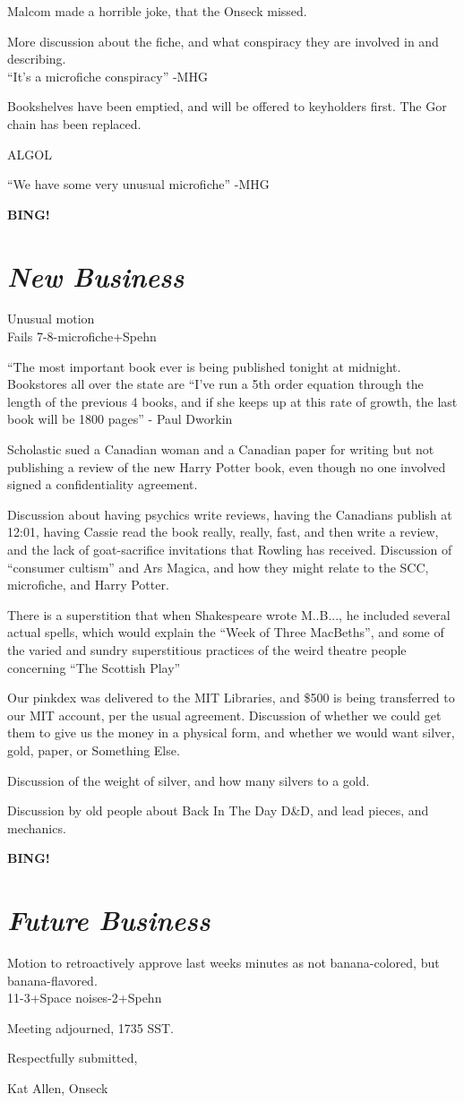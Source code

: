 \documentclass[12pt]{article}
\newcommand{\bing}{{\bf BING!} }
\newcommand{\goto}[1]{\bing \vskip 12pt \section*{{\em{#1}}}}
\begin{document}
Malcom made a horrible joke, that the Onseck missed.

More discussion about the fiche, and what conspiracy they are involved
in and describing.\\
``It's a microfiche conspiracy'' -MHG

Bookshelves have been emptied, and will be offered to keyholders
first.  The Gor chain has been replaced.


ALGOL

``We have some very unusual microfiche'' -MHG

\goto{New Business}
Unusual motion\\
Fails 7-8-microfiche+Spehn

``The most important book ever is being published tonight at
midnight. Bookstores all over the state are 
``I've run a 5th order equation through the length of the previous 4
books, and if she keeps up at this rate of growth, the last book will
be 1800 pages'' - Paul Dworkin

Scholastic sued a Canadian woman and a Canadian paper for writing but
not publishing a review of the new Harry Potter book, even though no
one involved signed a confidentiality agreement.

Discussion about having psychics write reviews, having the Canadians
publish at 12:01, having Cassie read the book really, really, fast,
and then write a review, and the lack of goat-sacrifice invitations
that Rowling has received.  Discussion of ``consumer cultism'' and Ars
Magica, and how they might relate to the SCC, microfiche, and Harry
Potter. 

There is a superstition that when Shakespeare wrote M..B..., he
included several actual spells, which would explain the ``Week of
Three MacBeths'', and some of the varied and sundry superstitious
practices of the weird theatre people concerning ``The Scottish Play''

Our pinkdex was delivered to the MIT Libraries, and \$500 is being
transferred to our MIT account, per the usual agreement.
Discussion of whether we could get them to give us the money in a
physical form, and whether we would want silver, gold, paper, or
Something Else.

Discussion of the weight of silver, and how many silvers to a gold.

Discussion by old people about Back In The Day D\&D, and lead pieces, and mechanics.

\goto{Future Business}
Motion to retroactively approve last weeks minutes as not
banana-colored, but banana-flavored.\\
11-3+Space noises-2+Spehn


\vspace{12pt}

\noindent
Meeting adjourned, 1735 SST.

\vspace{18pt}

\centerline{Respectfully submitted,}
\centerline{Kat Allen,  Onseck}
\end{document}
